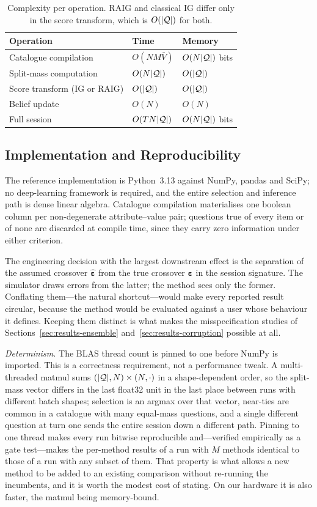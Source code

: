 \begin{table}[t]
\caption{Complexity per operation. RAIG and classical IG differ only in the
score transform, which is $O(|\mathcal{Q}|)$ for both.}
\label{tab:complexity}
\centering
\footnotesize
\begin{tabular}{@{}lll@{}}
\toprule
\textbf{Operation} & \textbf{Time} & \textbf{Memory} \\
\midrule
Catalogue compilation & $O(NM\bar{V})$ & $O(N|\mathcal{Q}|)$ bits \\
Split-mass computation & $O(N|\mathcal{Q}|)$ & $O(|\mathcal{Q}|)$ \\
Score transform (IG or RAIG) & $O(|\mathcal{Q}|)$ & $O(|\mathcal{Q}|)$ \\
Belief update & $O(N)$ & $O(N)$ \\
Full session & $O(TN|\mathcal{Q}|)$ & $O(N|\mathcal{Q}|)$ bits \\
\bottomrule
\end{tabular}
\end{table}

\subsection{Implementation and Reproducibility}

The reference implementation is Python~3.13 against NumPy, pandas and SciPy;
no deep-learning framework is required, and the entire selection and inference
path is dense linear algebra. Catalogue compilation materialises one boolean
column per non-degenerate attribute--value pair; questions true of every item
or of none are discarded at compile time, since they carry zero information
under either criterion.

The engineering decision with the largest downstream effect is the separation
of the assumed crossover $\hat{\boldsymbol\varepsilon}$ from the true crossover
$\boldsymbol\varepsilon$ in the session signature. The simulator draws errors
from the latter; the method sees only the former. Conflating them---the natural
shortcut---would make every reported result circular, because the method would
be evaluated against a user whose behaviour it defines. Keeping them distinct
is what makes the misspecification studies of
Sections~\ref{sec:results-ensemble} and~\ref{sec:results-corruption} possible
at all.

\emph{Determinism.} The BLAS thread count is pinned to one before NumPy is
imported. This is a correctness requirement, not a performance tweak. A
multi-threaded matmul sums $(|\mathcal{Q}|,N)\times(N,\cdot)$ in a shape-dependent
order, so the split-mass vector differs in the last float32 unit in the last
place between runs with different batch shapes; selection is an argmax over
that vector, near-ties are common in a catalogue with many equal-mass
questions, and a single different question at turn one sends the entire session
down a different path. Pinning to one thread makes every run bitwise
reproducible and---verified empirically as a gate test---makes the per-method
results of a run with $M$ methods identical to those of a run with any subset
of them. That property is what allows a new method to be added to an existing
comparison without re-running the incumbents, and it is worth the modest cost
of stating. On our hardware it is also faster, the matmul being memory-bound.
